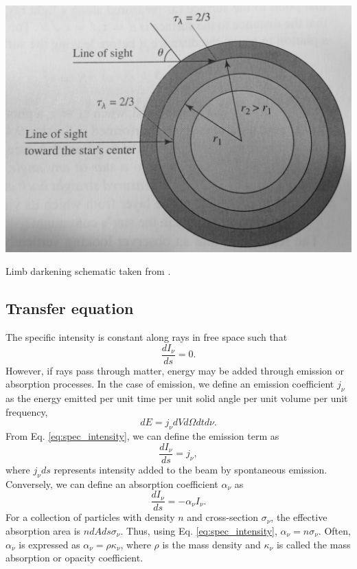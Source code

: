 	\begin{marginfigure}
		\centering
		\includegraphics[width=\columnwidth]{figures/limb_darkening.pdf}
		\caption{Limb darkening schematic taken from \citet[Ch. 9]{carroll_introduction_2007}.}
		\label{fig:limb_darkening}
	\end{marginfigure}
	
	\subsection{Transfer equation}
	The specific intensity is constant along rays in free space such that 
	\begin{equation}
		\frac{dI_{\nu}}{ds}=0.
	\end{equation}
	However, if rays pass through matter, energy may be added through emission or absorption processes. In the case of emission, we define an emission coefficient $j_{\nu}$ as the energy emitted per unit time per unit solid angle per unit volume per unit frequency,
	\begin{equation}
		dE=j_{\nu}dVd\Omega dtd\nu.
	\end{equation}
	From Eq. \ref{eq:spec_intensity}, we can define the emission term as 
	\begin{equation}
		\frac{dI_{\nu}}{ds} = j_{\nu},
	\end{equation}
	where $j_{\nu}ds$ represents intensity added to the beam by spontaneous emission. Conversely, we can define an absorption coefficient $\alpha_{\nu}$ as 
	\begin{equation}
		\frac{dI_{\nu}}{ds} = -\alpha_{\nu}I_{\nu}.
	\end{equation}
	For a collection of particles with density $n$ and cross-section $\sigma_{\nu}$, the effective absorption area is $ndAds\sigma_{\nu}$. Thus, using Eq. \ref{eq:spec_intensity}, $\alpha_{\nu} = n\sigma_{\nu}$. Often, $\alpha_{\nu}$ is expressed as $\alpha_{\nu}=\rho\kappa_{\nu}$, where $\rho$ is the mass density and $\kappa_{\nu}$ is called the mass absorption or opacity coefficient. 
	
